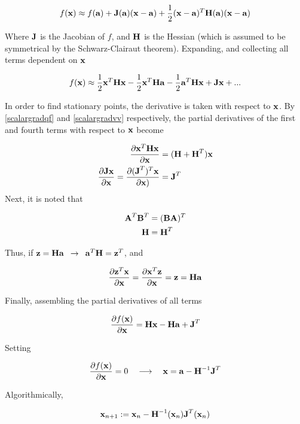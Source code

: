\documentclass{article}
\newcommand{\vect}[1]{\textbf{\textrm{#1}}}
\newcommand{\pd}[2]{\frac{\partial {#1}}{\partial {#2}}}
\begin{document}
\begin{equation} \label{taylornd}
	f(\vect{x}) \approx f(\vect{a}) + \vect{J}(\vect{a})(\vect{x} - \vect{a}) + 
						 \frac{1}{2}(\vect{x} - \vect{a})^{T}\vect{H}(\vect{a})(\vect{x} - \vect{a})
\end{equation}

Where $\vect{J}$ is the Jacobian of $f$, and $\vect{H}$ is the Hessian (which is assumed to be symmetrical by the Schwarz-Clairaut theorem). 
Expanding, and collecting all terms dependent on $\vect{x}$

\begin{equation*}
	f(\vect{x}) \approx \frac{1}{2}\vect{x}^{T}\vect{Hx} - \frac{1}{2}\vect{x}^{T}\vect{Ha} -
						 \frac{1}{2}\vect{a}^{T}\vect{Hx} + \vect{Jx} + ...
\end{equation*}

In order to find stationary points, the derivative is taken with respect to $\vect{x}$. 
By \eqref{scalargradqf} and \eqref{scalargradvv} respectively, the partial derivatives of the first and fourth terms with respect to $\vect{x}$ become

\begin{align*}
	\pd{\vect{x}^{T}\vect{Hx}}{\vect{x}} & = (\vect{H} + \vect{H}^{T})\vect{x} \\
	\pd{\vect{Jx}}{\vect{x}} = \pd{(\vect{J}^{T})^{T}\vect{x}}{\vect{x})} & = \vect{J}^{T}
\end{align*}
Next, it is noted that

\begin{align*}
	\vect{A}^{T}\vect{B}^{T} & = (\vect{BA})^{T} \\
	\vect{H} & = \vect{H}^{T}
\end{align*}
	
Thus, if $\vect{z} = \vect{Ha} \enspace \rightarrow \enspace \vect{a}^{T}\vect{H} = \vect{z}^{T}$, and

\begin{equation*}
	\pd{\vect{z}^{T}\vect{x}}{\vect{x}} = \pd{\vect{x}^{T}\vect{z}}{\vect{x}} = 
	\vect{z} = \vect{Ha}
\end{equation*}

Finally, assembling the partial derivatives of all terms

\begin{equation}
	\pd{f(\vect{x})}{\vect{x}} = \vect{Hx} - \vect{Ha} + \vect{J}^{T}
\end{equation}

Setting

\begin{equation*}
	\pd{f(\vect{x})}{\vect{x}} = 0 \quad \longrightarrow \quad 
	\vect{x} = \vect{a} - \vect{H}^{-1}\vect{J}^{T}
\end{equation*}

Algorithmically,

\begin{equation} \label{updaterule2}
	\vect{x}_{n+1} := \vect{x}_n - \vect{H}^{-1}(\vect{x}_n)\vect{J}^{T}(\vect{x}_n) 
\end{equation}



\end{document}
